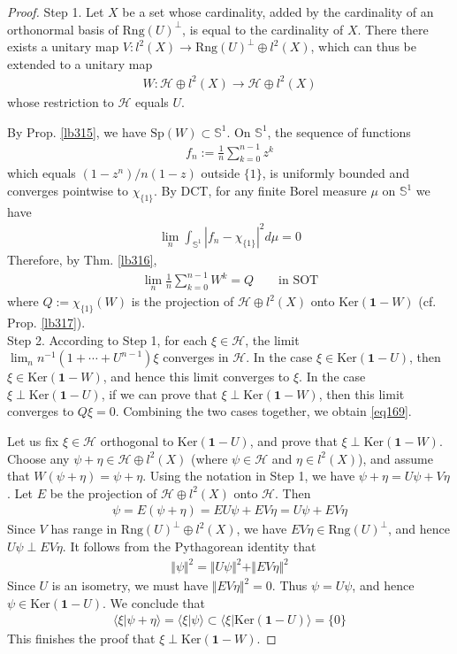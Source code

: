 \documentclass[12pt,b5paper,notitlepage]{article}
\theoremstyle{definition}
\theoremstyle{plain}
\newcommand{\idt}{\mathbf{1}}
\newcommand{\bk}[1]{\langle {#1}\rangle}
\newcommand{\Ker}{\mathrm{Ker}}
\newcommand{\Sp}{\mathrm{Sp}}
\newcommand{\Rng}{\mathrm{Rng}}
\newcommand{\Sbb}{{\mathbb S}}
\newcommand{\MH}{\mathcal H}
\numberwithin{equation}{section}
\begin{document}
\begin{proof}
Step 1. Let $X$ be a set whose cardinality, added by the cardinality of an orthonormal basis of $\Rng(U)^\perp$, is equal to the cardinality of $X$. There there exists a unitary map $V:l^2(X)\rightarrow \Rng(U)^\perp\oplus l^2(X)$, which can thus be extended to a unitary map
\begin{align*}
W: \MH\oplus l^2(X)\rightarrow\MH\oplus l^2(X)
\end{align*}
whose restriction to $\MH$ equals $U$. 

By Prop. \ref{lb315}, we have $\Sp(W)\subset\Sbb^1$. On $\Sbb^1$, the sequence of functions
\begin{align*}
f_n:=\frac 1n\sum_{k=0}^{n-1}z^k
\end{align*}
which equals $(1-z^n)/n(1-z)$ outside $\{1\}$, is uniformly bounded and converges pointwise to $\chi_{\{1\}}$. By DCT, for any finite Borel measure $\mu$ on $\Sbb^1$ we have
\begin{align*}
\lim_n\int_{\Sbb^1}|f_n-\chi_{\{1\}}|^2d\mu=0
\end{align*}
Therefore, by Thm. \ref{lb316}, 
\begin{align*}
\lim_n\frac 1{n}\sum_{k=0}^{n-1}W^k=Q\qquad\text{in SOT}
\end{align*}
where $Q:=\chi_{\{1\}}(W)$ is the projection of $\MH\oplus l^2(X)$ onto $\Ker(\idt-W)$ (cf. Prop. \ref{lb317}).\\[-1ex]

Step 2. According to Step 1, for each $\xi\in\MH$, the limit $\lim_n n^{-1}(1+\cdots +U^{n-1})\xi$ converges in $\MH$. In the case  $\xi\in\Ker(\idt-U)$, then $\xi\in\Ker(\idt-W)$, and hence this limit converges to $\xi$. In the case $\xi\perp\Ker(\idt-U)$, if we can prove that $\xi\perp\Ker(\idt-W)$, then this limit converges to $Q\xi=0$. Combining the two cases together, we obtain \eqref{eq169}.

Let us fix $\xi\in\MH$ orthogonal to $\Ker(\idt-U)$, and prove that $\xi\perp\Ker(\idt-W)$. Choose any $\psi+\eta\in \MH\oplus l^2(X)$ (where $\psi\in\MH$ and $\eta\in l^2(X)$), and assume that $W(\psi+\eta)=\psi+\eta$. Using the notation in Step 1, we have $\psi+\eta=U\psi+V\eta$. Let $E$ be the projection of $\MH\oplus l^2(X)$ onto $\MH$. Then
\begin{align*}
\psi=E(\psi+\eta)=EU\psi+EV\eta=U\psi+EV\eta
\end{align*}
Since $V$ has range in $\Rng(U)^\perp\oplus l^2(X)$, we have $EV\eta\in\Rng(U)^\perp$, and hence $U\psi\perp EV\eta$. It follows from the Pythagorean identity that
\begin{align*}
\Vert\psi\Vert^2=\Vert U\psi\Vert^2+\Vert EV\eta\Vert^2
\end{align*}
Since $U$ is an isometry, we must have $\Vert EV\eta\Vert^2=0$. Thus $\psi=U\psi$, and hence $\psi\in\Ker(\idt-U)$. We conclude that
\begin{align*}
\bk{\xi|\psi+\eta}=\bk{\xi|\psi}\subset\bk{\xi|\Ker(\idt-U)}=\{0\}
\end{align*}
This finishes the proof that $\xi\perp\Ker(\idt-W)$.
\end{proof}
\end{document}
